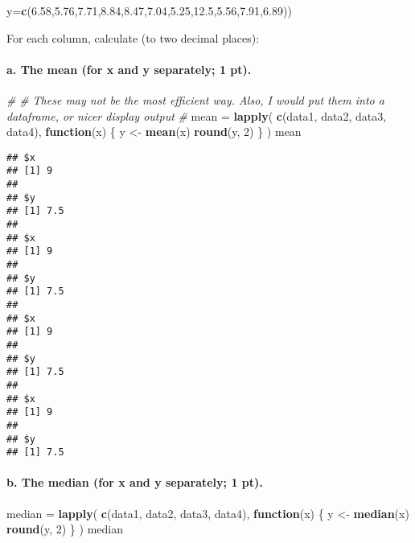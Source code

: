 \documentclass[]{article}
\newenvironment{Shaded}{\begin{snugshade}}{\end{snugshade}}
\newcommand{\KeywordTok}[1]{\textcolor[rgb]{0.13,0.29,0.53}{\textbf{#1}}}
\newcommand{\DataTypeTok}[1]{\textcolor[rgb]{0.13,0.29,0.53}{#1}}
\newcommand{\DecValTok}[1]{\textcolor[rgb]{0.00,0.00,0.81}{#1}}
\newcommand{\FloatTok}[1]{\textcolor[rgb]{0.00,0.00,0.81}{#1}}
\newcommand{\StringTok}[1]{\textcolor[rgb]{0.31,0.60,0.02}{#1}}
\newcommand{\CommentTok}[1]{\textcolor[rgb]{0.56,0.35,0.01}{\textit{#1}}}
\newcommand{\ControlFlowTok}[1]{\textcolor[rgb]{0.13,0.29,0.53}{\textbf{#1}}}
\newcommand{\NormalTok}[1]{#1}
\let\oldparagraph\paragraph
\renewcommand{\paragraph}[1]{\oldparagraph{#1}\mbox{}}
\begin{document}
\begin{Shaded}
\begin{Highlighting}[]
                    \DataTypeTok{y=}\KeywordTok{c}\NormalTok{(}\FloatTok{6.58}\NormalTok{,}\FloatTok{5.76}\NormalTok{,}\FloatTok{7.71}\NormalTok{,}\FloatTok{8.84}\NormalTok{,}\FloatTok{8.47}\NormalTok{,}\FloatTok{7.04}\NormalTok{,}\FloatTok{5.25}\NormalTok{,}\FloatTok{12.5}\NormalTok{,}\FloatTok{5.56}\NormalTok{,}\FloatTok{7.91}\NormalTok{,}\FloatTok{6.89}\NormalTok{))}
\end{Highlighting}
\end{Shaded}

For each column, calculate (to two decimal places):

\paragraph{a. The mean (for x and y separately; 1
pt).}\label{a.-the-mean-for-x-and-y-separately-1-pt.}

\begin{Shaded}
\begin{Highlighting}[]
\CommentTok{#}
\CommentTok{# These may not be the most efficient way. Also, I would put them into a dataframe, or nicer display output}
\CommentTok{#}
\NormalTok{mean =}\StringTok{ }\KeywordTok{lapply}\NormalTok{(}
  \KeywordTok{c}\NormalTok{(data1, data2, data3, data4),}
  \ControlFlowTok{function}\NormalTok{(x) }
\NormalTok{  \{}
\NormalTok{    y <-}\StringTok{ }\KeywordTok{mean}\NormalTok{(x)}
    \KeywordTok{round}\NormalTok{(y, }\DecValTok{2}\NormalTok{)}
\NormalTok{  \}}
\NormalTok{)}
\NormalTok{mean}
\end{Highlighting}
\end{Shaded}

\begin{verbatim}
## $x
## [1] 9
## 
## $y
## [1] 7.5
## 
## $x
## [1] 9
## 
## $y
## [1] 7.5
## 
## $x
## [1] 9
## 
## $y
## [1] 7.5
## 
## $x
## [1] 9
## 
## $y
## [1] 7.5
\end{verbatim}

\paragraph{b. The median (for x and y separately; 1
pt).}\label{b.-the-median-for-x-and-y-separately-1-pt.}

\begin{Shaded}
\begin{Highlighting}[]
\NormalTok{median =}\StringTok{ }\KeywordTok{lapply}\NormalTok{(}
  \KeywordTok{c}\NormalTok{(data1, data2, data3, data4),}
  \ControlFlowTok{function}\NormalTok{(x) }
\NormalTok{  \{}
\NormalTok{    y <-}\StringTok{ }\KeywordTok{median}\NormalTok{(x)}
    \KeywordTok{round}\NormalTok{(y, }\DecValTok{2}\NormalTok{)}
\NormalTok{  \}}
\NormalTok{)}
\NormalTok{median}
\end{Highlighting}
\end{Shaded}
\end{document}
